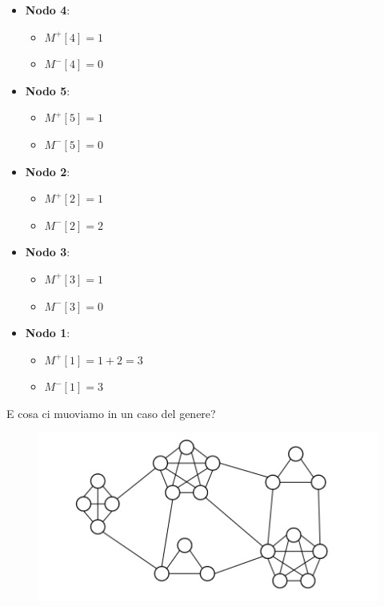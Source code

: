 \begin{itemize}
    \item \textbf{Nodo 4}:
          \begin{itemize}
              \item $M^+[4] = 1$
              \item $M^-[4] = 0$
          \end{itemize}
    \item \textbf{Nodo 5}:
          \begin{itemize}
              \item $M^+[5] = 1$
              \item $M^-[5] = 0$
          \end{itemize}

    \item \textbf{Nodo 2}:
          \begin{itemize}
              \item $M^+[2] = 1$
              \item $M^-[2] = 2$
          \end{itemize}

    \item \textbf{Nodo 3}:
          \begin{itemize}
              \item $M^+[3] = 1$
              \item $M^-[3] = 0$
          \end{itemize}

    \item \textbf{Nodo 1}:
          \begin{itemize}
              \item $M^+[1] = 1+2 = 3$
              \item $M^-[1] = 3$
          \end{itemize}
\end{itemize}

E cosa ci muoviamo in un caso del genere?


\begin{figure}[H]
    \begin{center}
        \includegraphics[scale=0.5]{chapters/images/mis clique.png}
    \end{center}
\end{figure}

